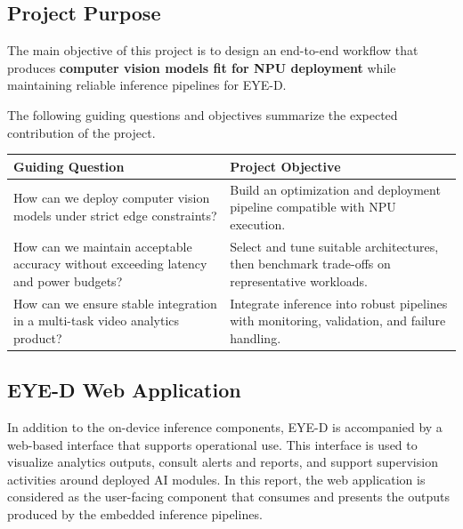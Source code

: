 \subsection{Project Purpose}
The main objective of this project is to design an end-to-end workflow that produces \textbf{computer vision models fit for NPU deployment} while maintaining reliable inference pipelines for EYE-D.

The following guiding questions and objectives summarize the expected contribution of the project.

\begin{center}
\renewcommand{\arraystretch}{1.2}
\label{tab:guiding-questions}
\begin{tabular}{|p{}|p{}|}
\hline
\textbf{Guiding Question} & \textbf{Project Objective} \\
\hline
How can we deploy computer vision models under strict edge constraints? & Build an optimization and deployment pipeline compatible with NPU execution. \\
\hline
How can we maintain acceptable accuracy without exceeding latency and power budgets? & Select and tune suitable architectures, then benchmark trade-offs on representative workloads. \\
\hline
How can we ensure stable integration in a multi-task video analytics product? & Integrate inference into robust pipelines with monitoring, validation, and failure handling. \\
\hline
\end{tabular}
\end{center}

\subsection{EYE-D Web Application}
In addition to the on-device inference components, EYE-D is accompanied by a web-based interface that supports operational use. This interface is used to visualize analytics outputs, consult alerts and reports, and support supervision activities around deployed AI modules. In this report, the web application is considered as the user-facing component that consumes and presents the outputs produced by the embedded inference pipelines.

